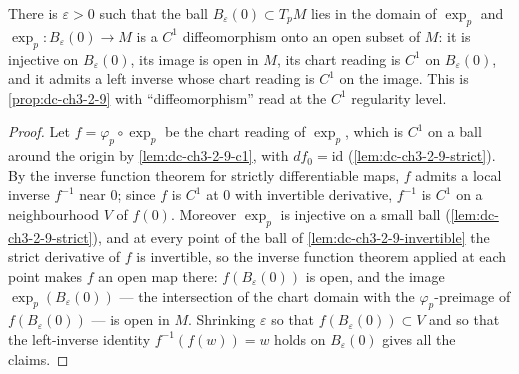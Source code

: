 \begin{lemma}
  \label{lem:dc-ch3-2-9-c1diffeo}


  There is $\varepsilon > 0$ such that the ball
  $B_\varepsilon(0) \subset T_pM$ lies in the domain of $\exp_p$ and
  $\exp_p : B_\varepsilon(0) \to M$ is a $C^1$ diffeomorphism onto an open
  subset of $M$: it is injective on $B_\varepsilon(0)$, its image is open in
  $M$, its chart reading is $C^1$ on $B_\varepsilon(0)$, and it admits a left
  inverse whose chart reading is $C^1$ on the image. This is
  \cref{prop:dc-ch3-2-9} with ``diffeomorphism'' read at the $C^1$ regularity
  level.
\end{lemma}
\begin{proof}
  \sketch

  Let $f = \varphi_p \circ \exp_p$ be the chart reading of $\exp_p$, which is
  $C^1$ on a ball around the origin by \cref{lem:dc-ch3-2-9-c1}, with
  $df_0 = \mathrm{id}$ (\cref{lem:dc-ch3-2-9-strict}). By the inverse function
  theorem for strictly differentiable maps, $f$ admits a local inverse
  $f^{-1}$ near $0$; since $f$ is $C^1$ at $0$ with invertible derivative,
  $f^{-1}$ is $C^1$ on a neighbourhood $V$ of $f(0)$. Moreover $\exp_p$ is
  injective on a small ball (\cref{lem:dc-ch3-2-9-strict}), and at every point
  of the ball of \cref{lem:dc-ch3-2-9-invertible} the strict derivative of $f$
  is invertible, so the inverse function theorem applied at each point makes
  $f$ an open map there: $f(B_\varepsilon(0))$ is open, and the image
  $\exp_p(B_\varepsilon(0))$ — the intersection of the chart domain with the
  $\varphi_p$-preimage of $f(B_\varepsilon(0))$ — is open in $M$. Shrinking
  $\varepsilon$ so that $f(B_\varepsilon(0)) \subset V$ and so that the
  left-inverse identity $f^{-1}(f(w)) = w$ holds on $B_\varepsilon(0)$ gives
  all the claims.
\end{proof}

